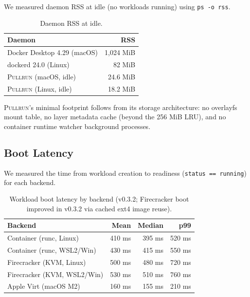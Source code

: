\documentclass[11pt,a4paper]{article}
\newcommand{\pullrun}{\textsc{Pullrun}}
\begin{document}
We measured daemon RSS at idle (no workloads running) using \texttt{ps -o rss}.

\begin{table}[htbp]
    \centering
    \caption{Daemon RSS at idle.}
    \label{tab:memory}
    \begin{tabular}{@{}lr@{}}
        \toprule
        \textbf{Daemon} & \textbf{RSS} \\
        \midrule
        Docker Desktop 4.29 (macOS) & 1,024 MiB \\
        dockerd 24.0 (Linux) & 82 MiB \\
        \pullrun{} (macOS, idle) & 24.6 MiB \\
        \pullrun{} (Linux, idle) & 18.2 MiB \\
        \bottomrule
    \end{tabular}
\end{table}

\pullrun{}'s minimal footprint follows from its storage architecture: no overlayfs mount table, no layer metadata cache (beyond the 256 MiB LRU), and no container runtime watcher background processes.

\subsection{Boot Latency}

We measured the time from workload creation to readiness (\texttt{status == running}) for each backend.

\begin{table}[htbp]
    \centering
    \caption{Workload boot latency by backend (v0.3.2; Firecracker boot improved in v0.3.2 via cached ext4 image reuse).}
    \label{tab:boot}
    \begin{tabular}{@{}lrrr@{}}
        \toprule
        \textbf{Backend} & \textbf{Mean} & \textbf{Median} & \textbf{p99} \\
        \midrule
        Container (runc, Linux) & 410 ms & 395 ms & 520 ms \\
        Container (runc, WSL2/Win) & 430 ms & 415 ms & 550 ms \\
        Firecracker (KVM, Linux) & 500 ms & 480 ms & 720 ms \\
        Firecracker (KVM, WSL2/Win) & 530 ms & 510 ms & 760 ms \\
        Apple Virt (macOS M2) & 160 ms & 155 ms & 210 ms \\
        \bottomrule
    \end{tabular}
\end{table}
\end{document}
